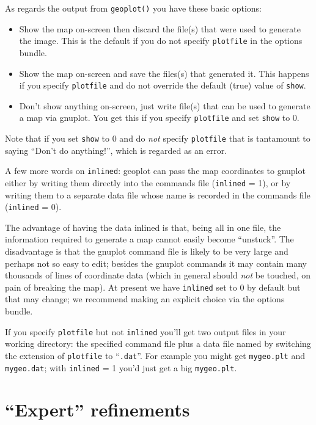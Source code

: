 \documentclass{article}
\begin{document}
As regards the output from \texttt{geoplot()} you have these basic
options:
\begin{itemize}
\item Show the map on-screen then discard the file(s) that were used
  to generate the image. This is the default if you do not specify
  \texttt{plotfile} in the options bundle.
\item Show the map on-screen and save the files(s) that generated it.
  This happens if you specify \texttt{plotfile} and do not override
  the default (true) value of \texttt{show}.
\item Don't show anything on-screen, just write file(s) that can be
  used to generate a map via gnuplot. You get this if you specify
  \texttt{plotfile} and set \texttt{show} to 0.
\end{itemize}

Note that if you set \texttt{show} to 0 and do \textit{not} specify
\texttt{plotfile} that is tantamount to saying ``Don't do anything!'',
which is regarded as an error.

A few more words on \texttt{inlined}: \textsf{geoplot} can pass the
map coordinates to gnuplot either by writing them directly into the
commands file (\texttt{inlined} = 1), or by writing them to a separate
data file whose name is recorded in the commands file
(\texttt{inlined} = 0).

The advantage of having the data inlined is that, being all in one
file, the information required to generate a map cannot easily become
``unstuck''. The disadvantage is that the gnuplot command file is
likely to be very large and perhaps not so easy to edit; besides the
gnuplot commands it may contain many thousands of lines of coordinate
data (which in general should \textit{not} be touched, on pain of
breaking the map). At present we have \texttt{inlined} set to 0 by
default but that may change; we recommend making an explicit choice
via the options bundle.

If you specify \texttt{plotfile} but not \texttt{inlined} you'll get
two output files in your working directory: the specified command file
plus a data file named by switching the extension of \texttt{plotfile}
to ``\texttt{.dat}''. For example you might get \texttt{mygeo.plt} and
\texttt{mygeo.dat}; with \texttt{inlined} = 1 you'd just get a big
\texttt{mygeo.plt}.

\section{``Expert'' refinements}
\label{sec:expert}
\end{document}
